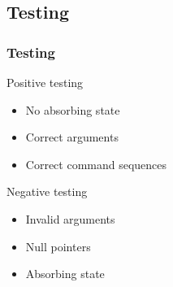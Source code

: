 \documentclass{beamer}
\begin{document}
\subsection{Testing}

\begin{frame}
  \frametitle{Testing}
  \begin{block}{Positive testing}
    \begin{itemize}
      \item No absorbing state
      \item Correct arguments
      \item Correct command sequences
    \end{itemize}
  \end{block}
  \begin{block}{Negative testing}
    \begin{itemize}
      \item Invalid arguments
      \item Null pointers
      \item Absorbing state
    \end{itemize}
  \end{block}
\end{frame}

\end{document}
